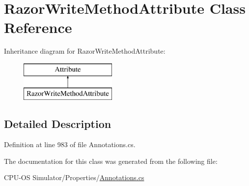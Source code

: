\hypertarget{class_razor_write_method_attribute}{}\section{Razor\+Write\+Method\+Attribute Class Reference}
\label{class_razor_write_method_attribute}
Inheritance diagram for Razor\+Write\+Method\+Attribute\+:\begin{figure}[H]
\begin{center}
\leavevmode
\includegraphics[height=2.000000cm]{class_razor_write_method_attribute}
\end{center}
\end{figure}


\subsection{Detailed Description}


Definition at line 983 of file Annotations.\+cs.



The documentation for this class was generated from the following file\+:\begin{DoxyCompactItemize}
\item 
C\+P\+U-\/\+O\+S Simulator/\+Properties/\hyperlink{_annotations_8cs}{Annotations.\+cs}\end{DoxyCompactItemize}
